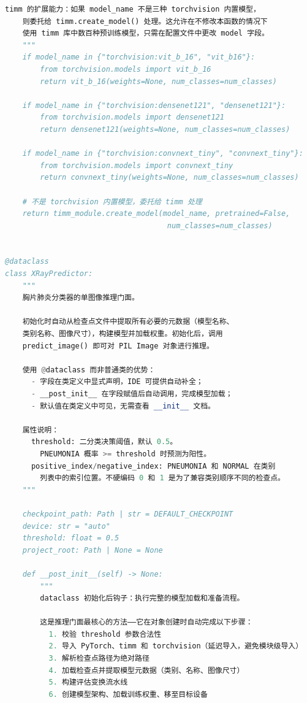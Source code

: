 \documentclass[12pt,a4paper,UTF8,openany]{ctexbook}
\begin{document}
\begin{lstlisting}[language=Python, caption={推理接口模块（inference.py）}, label={lst:inference}]
    timm 的扩展能力：如果 model_name 不是三种 torchvision 内置模型，
    则委托给 timm.create_model() 处理。这允许在不修改本函数的情况下
    使用 timm 库中数百种预训练模型，只需在配置文件中更改 model 字段。
    """
    if model_name in {"torchvision:vit_b_16", "vit_b16"}:
        from torchvision.models import vit_b_16
        return vit_b_16(weights=None, num_classes=num_classes)

    if model_name in {"torchvision:densenet121", "densenet121"}:
        from torchvision.models import densenet121
        return densenet121(weights=None, num_classes=num_classes)

    if model_name in {"torchvision:convnext_tiny", "convnext_tiny"}:
        from torchvision.models import convnext_tiny
        return convnext_tiny(weights=None, num_classes=num_classes)

    # 不是 torchvision 内置模型，委托给 timm 处理
    return timm_module.create_model(model_name, pretrained=False,
                                     num_classes=num_classes)


@dataclass
class XRayPredictor:
    """
    胸片肺炎分类器的单图像推理门面。

    初始化时自动从检查点文件中提取所有必要的元数据（模型名称、
    类别名称、图像尺寸），构建模型并加载权重。初始化后，调用
    predict_image() 即可对 PIL Image 对象进行推理。

    使用 @dataclass 而非普通类的优势：
      - 字段在类定义中显式声明，IDE 可提供自动补全；
      - __post_init__ 在字段赋值后自动调用，完成模型加载；
      - 默认值在类定义中可见，无需查看 __init__ 文档。

    属性说明：
      threshold: 二分类决策阈值，默认 0.5。
        PNEUMONIA 概率 >= threshold 时预测为阳性。
      positive_index/negative_index: PNEUMONIA 和 NORMAL 在类别
        列表中的索引位置。不硬编码 0 和 1 是为了兼容类别顺序不同的检查点。
    """

    checkpoint_path: Path | str = DEFAULT_CHECKPOINT
    device: str = "auto"
    threshold: float = 0.5
    project_root: Path | None = None

    def __post_init__(self) -> None:
        """
        dataclass 初始化后钩子：执行完整的模型加载和准备流程。

        这是推理门面最核心的方法——它在对象创建时自动完成以下步骤：
          1. 校验 threshold 参数合法性
          2. 导入 PyTorch、timm 和 torchvision（延迟导入，避免模块级导入）
          3. 解析检查点路径为绝对路径
          4. 加载检查点并提取模型元数据（类别、名称、图像尺寸）
          5. 构建评估变换流水线
          6. 创建模型架构、加载训练权重、移至目标设备


\end{lstlisting}
\end{document}
